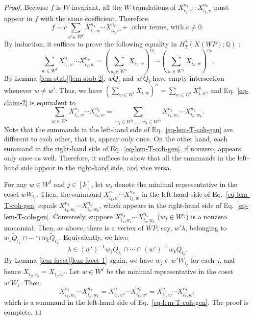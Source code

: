 \documentclass{amsart}
\theoremstyle{definition}
\theoremstyle{remark}
\numberwithin{equation}{section}
\begin{document}
\begin{proof}
    Because $f$ is $W$-invariant, all the $W$-translations of $X_{i_1, e}^{n_1} \cdots X_{i_k, e}^{n_k}$ must appear in $f$ with the same coefficient.
    Therefore, 
    \[f = c \sum_{w \in W^I} X_{i_1, w}^{n_1} \cdots X_{i_k, w}^{n_k} + \text{ other terms, with $c \ne 0$}.\]
    By induction, it suffices to prove the following equality in $H^*_T(X(\mathit{WP}) ; \mathbb{Q})$ :
    \begin{equation} \label{eq-claim-2}
        \sum_{w \in W^I} X_{i_1, w}^{n_1} \cdots X_{i_k, w}^{n_k} = \left( \sum_{w \in W^{i_1}} X_{i_1,w} \right)^{n_1} \cdots \left( \sum_{w \in W^{i_k}} X_{i_k,w} \right)^{n_k}.
    \end{equation}
    By Lemma \ref{lem-stab}\eqref{lem-stab-2}, $w \widetilde{Q}_i$ and $w' \widetilde{Q}_i$ have empty intersection whenever $w \ne w'$.
    Thus, we have $(\sum_{w \in W^i} X_{i,w})^n = \sum_{w \in W^i} X_{i,w}^n$, and Eq.~\eqref{eq-claim-2} is equivalent to 
    \begin{equation} \label{eq-lem-T-coh-gen}
        \sum_{w \in W^I} X_{i_1, w}^{n_1} \cdots X_{i_k, w}^{n_k} =  \sum_{w_1 \in W^{i_1}, \dots, w_k \in W^{i_k}} X_{i_1,w_1}^{n_1}  \cdots  X_{i_k,w_k}^{n_k}.
    \end{equation}
    Note that the summands in the left-hand side of Eq.~\eqref{eq-lem-T-coh-gen} are different to each other, that is, appear only once.
    On the other hand, each summand in the right-hand side of Eq.~\eqref{eq-lem-T-coh-gen}, if nonzero, appears only once as well.
    Therefore, it suffices to show that all the summands in the left-hand side appear in the right-hand side, and vice versa.

    For any $w \in W^I$ and $j \in [k]$, let $w_j$ denote the minimal representative in the coset $wW_{i_j}$.
    Then, the summand $X_{i_1, w}^{n_1} \cdots X_{i_k, w}^{n_k}$ in the left-hand side of Eq.~\eqref{eq-lem-T-coh-gen} equals $X_{i_1, w_1}^{n_1} \cdots X_{i_k, w_k}^{n_k}$, which appears in the right-hand side of Eq.~\eqref{eq-lem-T-coh-gen}.
    Conversely, suppose $X_{i_1, w_1}^{n_1} \cdots X_{i_k, w_k}^{n_k}$ ($w_j \in W^{i_j}$) is a nonzero monomial.
    Then, as above, there is a vertex of $\mathit{WP}$, say, $w' \lambda$, belonging to $w_1 \widetilde{Q}_{i_1} \cap \cdots \cap w_k \widetilde{Q}_{i_k}$.
    Equivalently, we have
    \[\lambda \in (w')^{-1} w_1 \widetilde{Q}_{i_1} \cap \cdots \cap (w')^{-1} w_k \widetilde{Q}_{i_k}.\]
    By Lemma \ref{lem-facet}\eqref{lem-facet-1} again, we have $w_j \in w'W_{i_j}$ for each $j$, and hence $X_{i_j,w_j} = X_{i_j, w'}$.
    Let $w \in W^I$ be the minimal representative in  the coset $w' W_I$.
    Then, 
    \[X_{i_1, w_1}^{n_1} \cdots X_{i_k, w_k}^{n_k} = X_{i_1, w'}^{n_1} \cdots X_{i_k, w'}^{n_k}= X_{i_1, w}^{n_1} \cdots X_{i_k, w}^{n_k},\]
    which is a summand in the left-hand side of Eq.~\eqref{eq-lem-T-coh-gen}.
    The proof is complete.
\end{proof}
\end{document}
